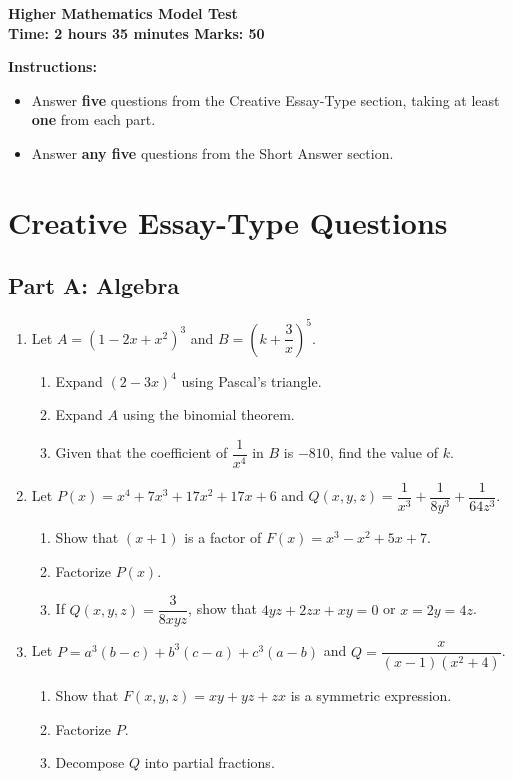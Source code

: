 \documentclass[12pt]{article}
\begin{document}
\begin{center}
    {\LARGE \textbf{Higher Mathematics Model Test}}\\[10pt]
    \textbf{Time: 2 hours 35 minutes \hfill Marks: 50}
\end{center}

\vspace{10pt}
\noindent\textbf{Instructions:} 
\begin{itemize}
    \item Answer \textbf{five} questions from the Creative Essay-Type section, taking at least \textbf{one} from each part.
    \item Answer \textbf{any five} questions from the Short Answer section.
\end{itemize}

\vspace{5pt}
\section*{Creative Essay-Type Questions}

\subsection*{Part A: Algebra}

\begin{enumerate}
    \item Let \( A = (1 - 2x + x^2)^3 \) and \( B = \left(k + \dfrac{3}{x}\right)^5 \).
    \begin{enumerate}
        \item Expand \( (2 - 3x)^4 \) using Pascal’s triangle.
        \item Expand \( A \) using the binomial theorem.
        \item Given that the coefficient of \( \dfrac{1}{x^4} \) in \( B \) is \( -810 \), find the value of \( k \).
    \end{enumerate}

    \item Let \( P(x) = x^4 + 7x^3 + 17x^2 + 17x + 6 \) and \( Q(x, y, z) = \dfrac{1}{x^3} + \dfrac{1}{8y^3} + \dfrac{1}{64z^3} \).
    \begin{enumerate}
        \item Show that \( (x + 1) \) is a factor of \( F(x) = x^3 - x^2 + 5x + 7 \).
        \item Factorize \( P(x) \).
        \item If \( Q(x, y, z) = \dfrac{3}{8xyz} \), show that \( 4yz + 2zx + xy = 0 \) or \( x = 2y = 4z \).
    \end{enumerate}

    \item Let \( P = a^3(b - c) + b^3(c - a) + c^3(a - b) \) and \( Q = \dfrac{x}{(x - 1)(x^2 + 4)} \).
    \begin{enumerate}
        \item Show that \( F(x, y, z) = xy + yz + zx \) is a symmetric expression.
        \item Factorize \( P \).
        \item Decompose \( Q \) into partial fractions.
    \end{enumerate}
\end{enumerate}
\end{document}
